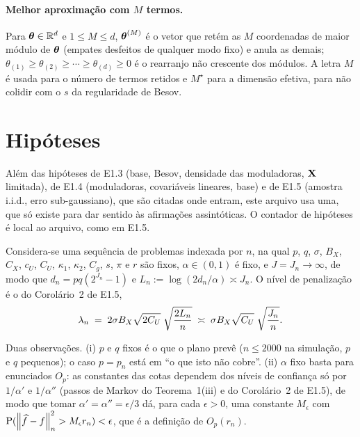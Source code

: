\documentclass[11pt,a4paper]{article}
\newcommand{\Mstar}{M^{\star}}
\begin{document}
\paragraph{Melhor aproximação com $M$ termos.} Para $\boldsymbol{\theta} \in \mathbb{R}^{d}$ e
$1 \le M \le d$, $\boldsymbol{\theta}^{(M)}$ é o vetor que retém as $M$ coordenadas de
maior módulo de $\boldsymbol{\theta}$ (empates desfeitos de qualquer modo fixo) e anula as
demais; $\theta_{(1)} \ge \theta_{(2)} \ge \cdots \ge \theta_{(d)} \ge 0$ é o
rearranjo não crescente dos módulos. A letra $M$ é usada para o número de
termos retidos e $\Mstar$ para a dimensão efetiva, para não colidir com o $s$
da regularidade de Besov.

\section{Hipóteses}

Além das hipóteses de E1.3 (base, Besov, densidade das moduladoras, $\mathbf{X}$
limitada), de E1.4 (moduladoras, covariáveis lineares, base) e de E1.5
(amostra i.i.d., erro sub-gaussiano), que são citadas onde entram, este
arquivo usa uma, que só existe para dar sentido às afirmações assintóticas. O
contador de hipóteses é local ao arquivo, como em E1.5.

\begin{assumption}\label{ass:regime}
Considera-se uma sequência de problemas indexada por $n$, na qual
$p$, $q$, $\sigma$, $B_{X}$, $C_{X}$, $c_{U}$, $C_{U}$, $\kappa_{1}$,
$\kappa_{2}$, $C_{g}$, $s$, $\pi$ e $r$ são fixos, $\alpha \in (0,1)$ é fixo, e
$J = J_{n} \to \infty$, de modo que $d_{n} = pq(2^{J_{n}}-1)$ e
$L_{n} := \log(2d_{n}/\alpha) \asymp J_{n}$. O nível de penalização é o do
Corolário~2 de E1.5,
\begin{equation}
  \label{eq:lambda-n}
  \lambda_{n} \;=\; 2\sigma B_{X}\sqrt{2C_{U}}\;\sqrt{\frac{2L_{n}}{n}}
  \;\asymp\; \sigma B_{X}\sqrt{C_{U}}\;\sqrt{\frac{J_{n}}{n}} .
\end{equation}
\end{assumption}

Duas observações. (i) $p$ e $q$ fixos é o que o plano prevê ($n \le 2000$ na
simulação, $p$ e $q$ pequenos); o caso $p = p_{n}$ está em ``o que isto não
cobre''. (ii) $\alpha$ fixo basta para enunciados $O_{p}$: as constantes das
cotas dependem dos níveis de confiança só por $1/\alpha'$ e $1/\alpha''$
(passos de Markov do Teorema~1(iii) e do Corolário~2 de E1.5), de modo que
tomar $\alpha' = \alpha'' = \epsilon/3$ dá, para cada $\epsilon > 0$, uma
constante $M_{\epsilon}$ com
$\mathrm{P}(\left\lVert \widehat f - f \right\rVert_{n}^{2} > M_{\epsilon}r_{n}) < \epsilon$, que é a
definição de $O_{p}(r_{n})$.
\end{document}
